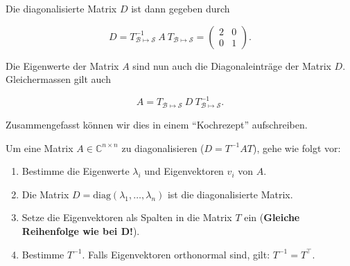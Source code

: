 Die diagonalisierte Matrix \( D \) ist dann gegeben durch

\begin{equation*}
    D = T_{\mathcal{B} \mapsto \mathcal{S} }^{-1} \ A \ T_{\mathcal{B} \mapsto \mathcal{S} } = \begin{pmatrix} 2 & 0 \\ 0 & 1 \end{pmatrix}.
\end{equation*}

Die Eigenwerte der Matrix \( A \) sind nun auch die Diagonaleinträge der Matrix \( D \). Gleichermassen gilt auch 

\begin{equation*}
    A = T_{\mathcal{B} \mapsto \mathcal{S} } \ D \ T_{\mathcal{B} \mapsto \mathcal{S} }^{-1}.
\end{equation*}

Zusammengefasst können wir dies in einem ``Kochrezept'' aufschreiben.

\begin{tcolorbox}[colback=gray!30, colframe=gray!80, title=Diagonalisieren]
    Um eine Matrix \( A \in \mathbb{C}^{n \times n} \) zu diagonalisieren (\( D = T^{-1}AT \)), gehe wie folgt vor:
    \begin{enumerate}
        \item Bestimme die Eigenwerte \( \lambda_i \) und Eigenvektoren \( v_i \) von \( A \).
        \item Die Matrix \( D = \text{diag}(\lambda_1, \dots , \lambda_n) \) ist die diagonalisierte Matrix.
        \item Setze die Eigenvektoren als Spalten in die Matrix \( T \) ein (\textbf{Gleiche Reihenfolge wie bei \( \mathbf{D} \)!}).
        \item Bestimme \( T^{-1} \). Falls Eigenvektoren orthonormal sind, gilt: \( T^{-1} = T^\top \).
    \end{enumerate}
\end{tcolorbox}




